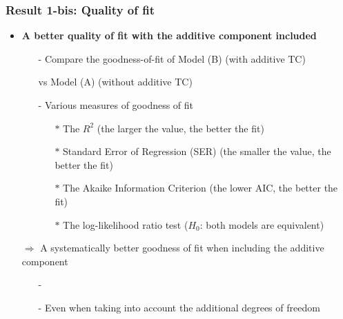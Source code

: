 \documentclass[10 pt,Helvetica, french]{beamer}
\begin{document}
\begin{frame}[label=slide_goodnessfit]
\frametitle{Result 1-bis: Quality of fit}
\begin{itemize}
\item \textbf{ A better quality of fit with the additive component included} \vspace{0.2cm}
\begin{itemize}
\item[-] Compare the goodness-of-fit of Model (B) (with additive TC)  \vspace{0.1cm}
\item[ ] vs Model (A) (without additive TC) \vspace{0.1cm}
\item[-] Various measures of goodness of fit \vspace{0.1cm}
\begin{itemize}
\item[$\ast$] The $R^2$ (the larger the value, the better the fit) \vspace{0.1cm}
\item[$\ast$] Standard Error of Regression (SER) (the smaller the value, the better the fit) \vspace{0.1cm}
\item[$\ast$] The Akaike Information Criterion (the lower AIC, the better the fit) \vspace{0.1cm}
\item[$\ast$] The log-likelihood ratio test ($H_0$: both models are equivalent) \vspace{0.1cm}
\end{itemize}
\end{itemize}
\item[$\Rightarrow$] A systematically better goodness of fit when including the additive component  \vspace{0.1cm}

\begin{itemize}
\item[-] \hyperlink{app_goodnessfit}{} \vspace{0.1cm}
\item[-] Even when taking into account the additional degrees of freedom
\end{itemize}
\end{itemize}
\end{frame}

\end{document}
